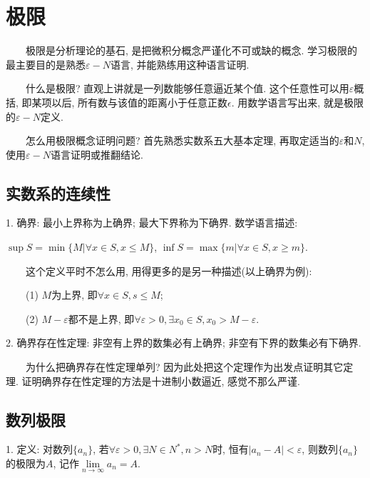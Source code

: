\section{极限}

\begin{tcolorbox}[colback=red!5,colframe=red!75!black]
~~~~极限是分析理论的基石, 是把微积分概念严谨化不可或缺的概念. 学习极限的最主要目的是熟悉$\varepsilon-N$语言, 并能熟练用这种语言证明.

~~~~什么是极限? 直观上讲就是一列数能够任意逼近某个值. 这个任意性可以用$\varepsilon$概括, 即某项以后, 所有数与该值的距离小于任意正数$\epsilon$. 
用数学语言写出来, 就是极限的$\varepsilon-N$定义.

~~~~怎么用极限概念证明问题? 首先熟悉实数系五大基本定理, 再取定适当的$\varepsilon$和$N$, 使用$\varepsilon-N$语言证明或推翻结论.

\end{tcolorbox}

\subsection{实数系的连续性}

1. 确界: 最小上界称为上确界; 最大下界称为下确界. 数学语言描述: 

$\sup S =\min\{M|\forall x \in S, x \leq M\}$, 
$\inf S =\max\{m|\forall x \in S, x \geq m\}$.

\begin{tcolorbox}[colback=yellow!10,colframe=red!75!black,title=小窍门]
 ~~~~这个定义平时不怎么用, 用得更多的是另一种描述(以上确界为例):

 ~~~~(1) $M$为上界, 即$\forall x \in S, s \leq M$;
 
 ~~~~(2) $M-\varepsilon$都不是上界, 即$\forall \varepsilon>0, \exists x_0 \in S, x_0>M-\varepsilon$.

\end{tcolorbox}

2. 确界存在性定理: 非空有上界的数集必有上确界; 非空有下界的数集必有下确界.

\begin{tcolorbox}[colback=gray!5,colframe=orange!75!black,title=注意事项]
~~~~为什么把确界存在性定理单列? 因为此处把这个定理作为出发点证明其它定理. 证明确界存在性定理的方法是十进制小数逼近, 感觉不那么严谨.
\end{tcolorbox}

\subsection{数列极限}

1. 定义: 对数列$\{a_n\}$, 若$\forall \varepsilon>0, \exists N \in N^*, n>N$时, 恒有$|a_n-A|<\varepsilon$, 
则数列$\{a_n\}$的极限为$A$, 记作$\lim\limits_{n\rightarrow \infty} a_n=A$.